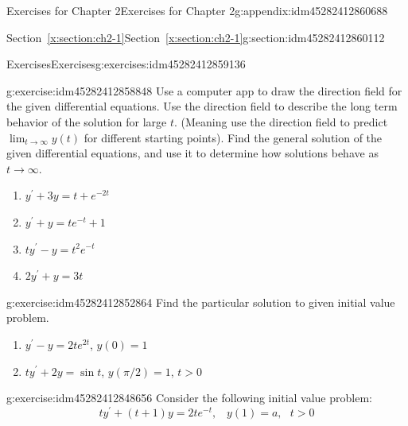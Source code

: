 \documentclass[oneside,10pt,]{book}
\numberwithin{equation}{section}
\numberwithin{equation}{section}
\begin{document}
\begin{appendixptx}{Exercises for Chapter 2}{}{Exercises for Chapter 2}{}{}{g:appendix:idm45282412860688}
%
%
\typeout{************************************************}
\typeout{************************************************}
%
\begin{sectionptx}{Section~\ref*{x:section:ch2-1}}{}{Section~\ref*{x:section:ch2-1}}{}{}{g:section:idm45282412860112}
%
%
\typeout{************************************************}
\typeout{************************************************}
%
\begin{exercises-subsection-numberless}{Exercises}{}{Exercises}{}{}{g:exercises:idm45282412859136}
\begin{divisionexercise}{1}{}{}{g:exercise:idm45282412858848}%
Use a computer app to draw the direction field for the given differential equations. Use the direction field to describe the long term behavior of the solution for large \(t\). (Meaning use the direction field to predict \(\lim_{t\to\infty}y(t)\) for different starting points). Find the general solution of the given differential equations, and use it to determine how solutions behave as \(t\to\infty\).%
%
\begin{enumerate}[label=(\alph*)]
\item{}\(y^{\prime}+3y=t+e^{-2t}\)%
\item{}\(y^{\prime}+y=te^{-t}+1\)%
\item{}\(ty^{\prime}-y=t^{2}e^{-t}\)%
\item{}\(2y^{\prime}+y=3t\)%
\end{enumerate}
\end{divisionexercise}%
\begin{divisionexercise}{2}{}{}{g:exercise:idm45282412852864}%
Find the particular solution to given initial value problem.%
%
\begin{enumerate}[label=(\alph*)]
\item{}\(y^{\prime}-y=2te^{2t}\), \(y(0)=1\)%
\item{}\(ty^{\prime}+2y=\sin t\), \(y\left(\pi/2\right)=1\), \(t>0\)%
\end{enumerate}
\end{divisionexercise}%
\begin{divisionexercise}{3}{}{}{g:exercise:idm45282412848656}%
Consider the following initial value problem:%
\begin{equation*}
ty^{\prime}+\left(t+1\right)y=2te^{-t},\,\,\,\,\,y(1)=a,\,\,\,\,t>0

\end{equation*}
\end{divisionexercise}
\end{exercises-subsection-numberless}
\end{sectionptx}
\end{appendixptx}
\end{document}
